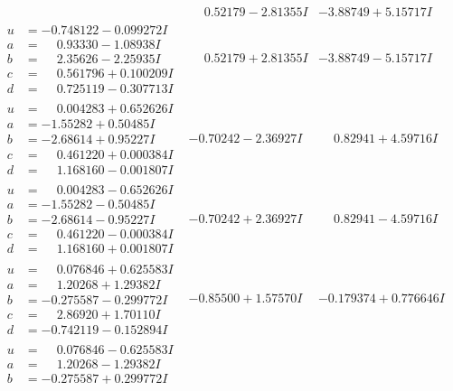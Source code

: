 \documentclass[1p]{elsarticle_modified}
\theoremstyle{definition}
\begin{document}
$$\begin{array}{c|c|c}
 & \phantom{-}0.52179 - 2.81355 I & -3.88749 + 5.15717 I \\ \hline\begin{aligned}
u &= -0.748122 - 0.099272 I \\
a &= \phantom{-}0.93330 - 1.08938 I \\
b &= \phantom{-}2.35626 - 2.25935 I \\
c &= \phantom{-}0.561796 + 0.100209 I \\
d &= \phantom{-}0.725119 - 0.307713 I\end{aligned}
 & \phantom{-}0.52179 + 2.81355 I & -3.88749 - 5.15717 I \\ \hline\begin{aligned}
u &= \phantom{-}0.004283 + 0.652626 I \\
a &= -1.55282 + 0.50485 I \\
b &= -2.68614 + 0.95227 I \\
c &= \phantom{-}0.461220 + 0.000384 I \\
d &= \phantom{-}1.168160 - 0.001807 I\end{aligned}
 & -0.70242 - 2.36927 I & \phantom{-}0.82941 + 4.59716 I \\ \hline\begin{aligned}
u &= \phantom{-}0.004283 - 0.652626 I \\
a &= -1.55282 - 0.50485 I \\
b &= -2.68614 - 0.95227 I \\
c &= \phantom{-}0.461220 - 0.000384 I \\
d &= \phantom{-}1.168160 + 0.001807 I\end{aligned}
 & -0.70242 + 2.36927 I & \phantom{-}0.82941 - 4.59716 I \\ \hline\begin{aligned}
u &= \phantom{-}0.076846 + 0.625583 I \\
a &= \phantom{-}1.20268 + 1.29382 I \\
b &= -0.275587 - 0.299772 I \\
c &= \phantom{-}2.86920 + 1.70110 I \\
d &= -0.742119 - 0.152894 I\end{aligned}
 & -0.85500 + 1.57570 I & -0.179374 + 0.776646 I \\ \hline\begin{aligned}
u &= \phantom{-}0.076846 - 0.625583 I \\
a &= \phantom{-}1.20268 - 1.29382 I \\
b &= -0.275587 + 0.299772 I \\

\end{aligned}
\end{array}$$
\end{document}
